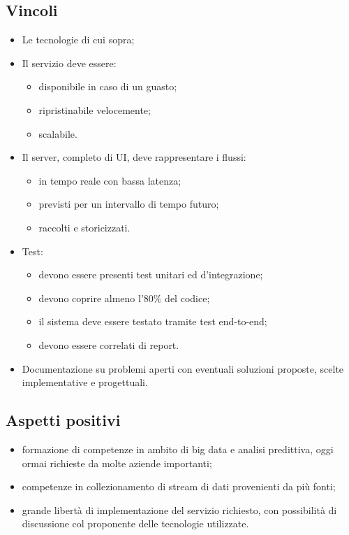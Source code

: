 \subsection{Vincoli}
\begin{itemize}
    \item Le tecnologie di cui sopra;
    \item Il servizio deve essere:
    \begin{itemize}
        \item disponibile in caso di un guasto;
        \item ripristinabile velocemente;
        \item scalabile.
    \end{itemize}
    \item Il server, completo di UI, deve rappresentare i flussi:
    \begin{itemize}
        \item in tempo reale con bassa latenza;
        \item previsti per un intervallo di tempo futuro;
        \item raccolti e storicizzati.
    \end{itemize}
    \item Test:
    \begin{itemize}
        \item devono essere presenti test unitari ed d'integrazione;
        \item devono coprire almeno l'80\% del codice;
        \item il sistema deve essere testato tramite test end-to-end;
        \item devono essere correlati di report.
    \end{itemize}
    \item Documentazione su problemi aperti con eventuali soluzioni proposte, scelte implementative e progettuali.
\end{itemize}
\subsection{Aspetti positivi}
\begin{itemize}
    \item formazione di competenze in ambito di big data e analisi predittiva, oggi ormai richieste da molte aziende importanti;
    \item competenze in collezionamento di stream di dati provenienti da più fonti;
    \item grande libertà di implementazione del servizio richiesto, con possibilità di discussione col proponente delle tecnologie utilizzate.
\end{itemize}
